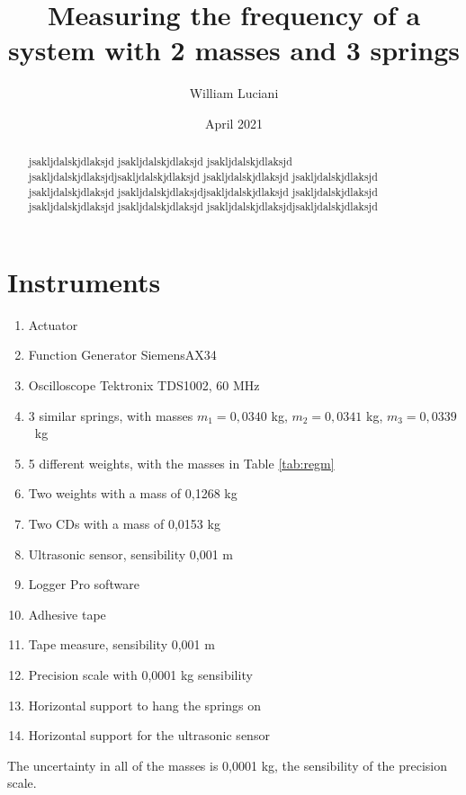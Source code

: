 \documentclass{article}
\title{ Measuring the frequency  of a system with 2 masses and 3 springs}
\author{William Luciani}
\date{April 2021}
\begin{document}
\maketitle

\begin{abstract}
    jsakljdalskjdlaksjd jsakljdalskjdlaksjd jsakljdalskjdlaksjd jsakljdalskjdlaksjdjsakljdalskjdlaksjd
    jsakljdalskjdlaksjd jsakljdalskjdlaksjd jsakljdalskjdlaksjd jsakljdalskjdlaksjdjsakljdalskjdlaksjd
    jsakljdalskjdlaksjd jsakljdalskjdlaksjd jsakljdalskjdlaksjd jsakljdalskjdlaksjdjsakljdalskjdlaksjd
\end{abstract}

\section{Instruments} \label{sec:instr}
\begin{enumerate}
    \item Actuator
    \item Function Generator SiemensAX34
    \item Oscilloscope Tektronix TDS1002, 60 MHz
    \item 3 similar springs, with masses $m_1 = 0,0340$ kg, $m_2 = 0,0341$ kg, \hbox{$m_3 = 0,0339$ kg}
    \item 5 different weights, with the masses in Table \ref{tab:regm}
    \item Two weights with a mass of 0,1268 kg
    \item Two CDs with a mass of 0,0153 kg          %
    \item Ultrasonic sensor, sensibility 0,001 m
    \item Logger Pro software
    \item Adhesive tape
    \item Tape measure, sensibility 0,001 m
    \item Precision scale with 0,0001 kg sensibility
    \item Horizontal support to hang the springs on
    \item Horizontal support for the ultrasonic
          sensor
\end{enumerate}
The uncertainty in all of the masses is 0,0001 kg, the sensibility of the precision scale.

\end{document}
